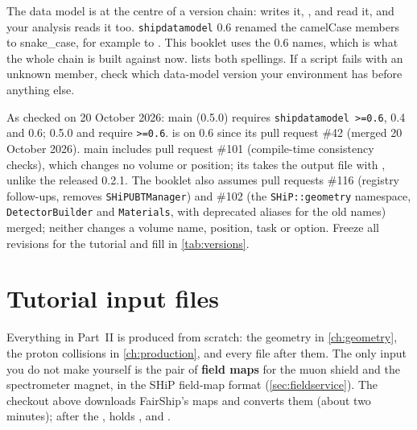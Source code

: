 \begin{pitfall}
The data model is at the centre of a version chain:  writes it,
,  and  read it, and your analysis
reads it too. \texttt{shipdatamodel} 0.6 renamed the camelCase members to
snake\_case, for example  to . This booklet
uses the 0.6 names, which is what the whole chain is built against now.
 lists both spellings. If a script fails with an
unknown member, check which data-model version your environment has before
anything else.
\end{pitfall}

\begin{organisernote}
As checked on 20 October 2026:  main (0.5.0) requires
\texttt{shipdatamodel >=0.6},  0.4 and
 0.6;  0.5.0 and  require
\texttt{>=0.6}.  is on 0.6 since its pull request \#42
(merged 20 October 2026).  main includes pull
request \#101 (compile-time consistency checks), which changes no volume or
position; its  takes the output file with ,
unlike the released 0.2.1. The booklet also assumes pull requests \#116
(registry follow-ups, removes \texttt{SHiPUBTManager}) and \#102 (the
\texttt{SHiP::geometry} namespace, \texttt{DetectorBuilder} and
\texttt{Materials}, with deprecated aliases for the old names) merged;
neither changes a volume name, position, task or 
option.
Freeze all revisions for the tutorial and fill in \cref{tab:versions}.
\end{organisernote}

\section{Tutorial input files}

Everything in Part~II is produced from scratch: the geometry in
\cref{ch:geometry}, the proton collisions in \cref{ch:production}, and every
file after them. The only input you do not make yourself is the pair of
\textbf{field maps} for the muon shield and the spectrometer magnet, in the
SHiP field-map format (\cref{sec:fieldservice}). The 
checkout above downloads FairShip's maps and converts them (about two
minutes); after the ,  holds
,  and
.

